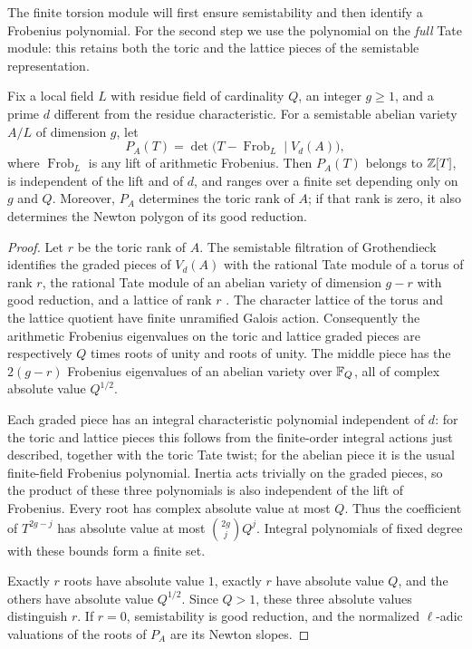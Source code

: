 The finite torsion module will first ensure semistability and then
identify a Frobenius polynomial.  For the second step we use the
polynomial on the \emph{full} Tate module: this retains both the toric and
the lattice pieces of the semistable representation.

\begin{lemma}
\label{loc:frobenius}
Fix a local field $L$ with residue field of cardinality $Q$, an integer
$g\geq 1$, and a prime $d$ different from the residue characteristic.
For a semistable abelian variety $A/L$ of dimension $g$, let
\[
 P_A(T)=\det\bigl(T-\operatorname{Frob}_L\mid V_d(A)\bigr),
\]
where $\operatorname{Frob}_L$ is any lift of arithmetic Frobenius.
Then $P_A(T)$ belongs to $\mathbb Z[T]$, is independent of the lift and of $d$,
and ranges over a finite set depending only on $g$ and $Q$.
Moreover, $P_A$ determines the toric rank of $A$; if that rank is zero,
it also determines the Newton polygon of its good reduction.
\end{lemma}

\begin{proof}
Let $r$ be the toric rank of $A$.  The semistable filtration of
Grothendieck identifies the graded pieces of $V_d(A)$ with the rational
Tate module of a torus of rank $r$, the rational Tate module of an abelian
variety of dimension $g-r$ with good reduction, and a lattice of rank $r$
\cite[Expos\'e IX]{SGA7I}.  The character lattice of the torus and the lattice quotient have finite
unramified Galois action.  Consequently the arithmetic Frobenius eigenvalues on the toric and
lattice graded pieces are respectively $Q$ times roots of unity and
roots of unity.  The middle
piece has the $2(g-r)$ Frobenius eigenvalues of an abelian variety over
$\mathbb F_Q$, all of complex absolute value $Q^{1/2}$.

Each graded piece has an integral characteristic polynomial independent
of $d$: for the toric and lattice pieces this follows from the finite-order
integral actions just described, together with the toric Tate twist;
for the abelian piece it is the
usual finite-field Frobenius polynomial.  Inertia acts trivially on the
graded pieces, so the product of these three polynomials is also
independent of the lift of Frobenius.  Every root has complex absolute
value at most $Q$.  Thus the coefficient of $T^{2g-j}$ has absolute value
at most $\binom{2g}{j}Q^j$.  Integral polynomials of fixed degree with
these bounds form a finite set.

Exactly $r$ roots have absolute value $1$, exactly $r$ have absolute value
$Q$, and the others have absolute value $Q^{1/2}$.  Since $Q>1$, these
three absolute values distinguish $r$.  If $r=0$, semistability is good
reduction, and the normalized $\ell$-adic valuations of the roots of
$P_A$ are its Newton slopes.
\end{proof}

